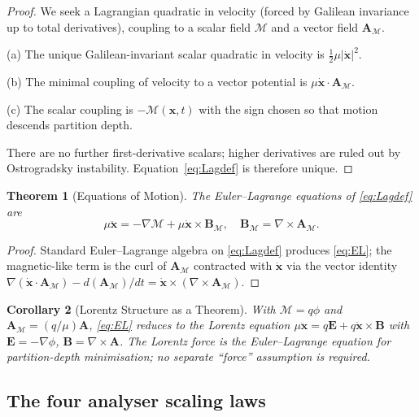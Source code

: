 \documentclass[twocolumn,10pt,a4paper]{article}
\theoremstyle{thmstyle}
\newtheorem{theorem}{Theorem}[section]
\newtheorem{corollary}[theorem]{Corollary}
\theoremstyle{definition}
\theoremstyle{remark}
\newcommand{\Depth}{\mathcal{M}}
\newcommand{\Apartition}{\mathbf{A}_{\Depth}}
\newcommand{\partinert}{\mu}
\begin{document}
\begin{proof}
We seek a Lagrangian quadratic in velocity (forced by Galilean
invariance up to total derivatives), coupling to a scalar field
$\Depth$ and a vector field $\Apartition$.

(a) The unique Galilean-invariant scalar quadratic in velocity is
$\tfrac{1}{2}\partinert|\dot{\mathbf{x}}|^{2}$.

(b) The minimal coupling of velocity to a vector potential is
$\partinert\dot{\mathbf{x}}\cdot\Apartition$.

(c) The scalar coupling is $-\Depth(\mathbf{x},t)$ with the sign
chosen so that motion descends partition depth.

There are no further first-derivative scalars; higher derivatives are
ruled out by Ostrogradsky instability. Equation~\eqref{eq:Lagdef} is
therefore unique.
\end{proof}

\begin{theorem}[Equations of Motion]
\label{thm:EOM}
The Euler--Lagrange equations of \eqref{eq:Lagdef} are
\begin{equation}
\partinert\ddot{\mathbf{x}}=-\nabla\Depth
+\partinert\dot{\mathbf{x}}\times\mathbf{B}_{\Depth},
\quad
\mathbf{B}_{\Depth}=\nabla\times\Apartition.
\label{eq:EL}
\end{equation}
\end{theorem}

\begin{proof}
Standard Euler--Lagrange algebra on \eqref{eq:Lagdef} produces
\eqref{eq:EL}; the magnetic-like term is the curl of $\Apartition$
contracted with $\dot{\mathbf{x}}$ via the vector identity
$\nabla(\dot{\mathbf{x}}\cdot\Apartition)
-d(\Apartition)/dt
=\dot{\mathbf{x}}\times(\nabla\times\Apartition)$.
\end{proof}

\begin{corollary}[Lorentz Structure as a Theorem]
\label{cor:lorentz}
With $\Depth=q\phi$ and $\Apartition=(q/\partinert)\mathbf{A}$,
\eqref{eq:EL} reduces to the Lorentz equation
$\partinert\ddot{\mathbf{x}}=q\mathbf{E}+q\dot{\mathbf{x}}\times\mathbf{B}$
with $\mathbf{E}=-\nabla\phi$, $\mathbf{B}=\nabla\times\mathbf{A}$.
The Lorentz force is the Euler--Lagrange equation for partition-depth
minimisation; no separate ``force'' assumption is required.
\end{corollary}

\subsection{The four analyser scaling laws}
\end{document}
